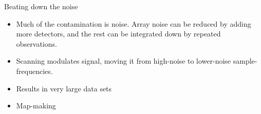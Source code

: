 \documentclass{beamer}
\begin{document}
\begin{frame}{Beating down the noise}
	\begin{itemize}
		\item Much of the contamination is noise. Array noise can be reduced by
			adding more detectors, and the rest can be integrated down by repeated
			observations.
		\item Scanning modulates signal, moving it from high-noise to lower-noise
			sample-frequencies.
		\item Results in very large data sets
		\item Map-making
	\end{itemize}
\end{frame}

%
\end{document}
